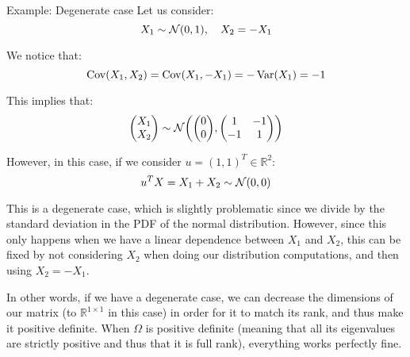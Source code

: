 \documentclass[a4paper]{article}
\begin{document}
\begin{parag}{Example: Degenerate case}
    Let us consider: 
    \[X_1 \followsdistr  \mathcal{N}\left(0, 1\right), \mathspace X_2 = - X_1\]
    
    We notice that: 
    \[\Cov\left(X_1, X_2\right) = \Cov\left(X_1, -X_1\right) = -\Var\left(X_1\right) = -1\]

    This implies that:
    \[\begin{pmatrix} X_1 \\ X_2 \end{pmatrix} \followsdistr \mathcal{N}\left(\begin{pmatrix} 0 \\ 0 \end{pmatrix}, \begin{pmatrix} 1 & -1 \\ -1 & 1 \end{pmatrix} \right)\]
    
    However, in this case, if we consider $u = \left(1, 1\right)^T \in \mathbb{R}^2$: 
    \[u^T X = X_1 + X_2 \followsdistr \mathcal{N}\left(0, 0\right)\]
    
    This is a degenerate case, which is slightly problematic since we divide by the standard deviation in the PDF of the normal distribution. However, since this only happens when we have a linear dependence between $X_1$ and $X_2$, this can be fixed by not considering $X_2$ when doing our distribution computations, and then using $X_2 = -X_1$. 

    In other words, if we have a degenerate case, we can decrease the dimensions of our matrix (to $\mathbb{R}^{1\times 1}$ in this case) in order for it to match its rank, and thus make it positive definite. When $\Omega$ is positive definite (meaning that all its eigenvalues are strictly positive and thus that it is full rank), everything works perfectly fine.
\end{parag}
\end{document}
